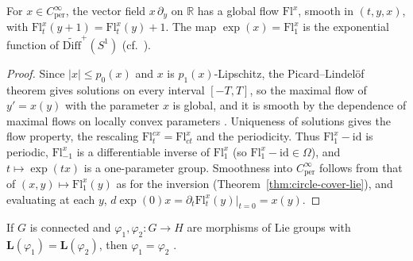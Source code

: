\begin{theorem}
  \label{thm:circle-cover-exp}
  \leanok
  For $x \in C^\infty_{\mathrm{per}}$, the vector field $x\,\partial_y$ on $\mathbb{R}$ has a
  global flow $\mathrm{Fl}^x$, smooth in $(t, y, x)$, with
  $\mathrm{Fl}^x_t(y + 1) = \mathrm{Fl}^x_t(y) + 1$. The map
  $\exp(x) = \mathrm{Fl}^x_1$ is the exponential function of
  $\widetilde{\mathrm{Diff}}^+(S^1)$ (cf.\ \cite[\S13.3]{GN26}).
\end{theorem}

\begin{proof}
  \leanok
  Since $|x| \le p_0(x)$ and $x$ is $p_1(x)$-Lipschitz, the Picard--Lindel\"of theorem gives
  solutions on every interval $[-T, T]$, so the maximal flow of $y' = x(y)$ with the parameter $x$
  is global, and it is smooth by the dependence of maximal flows on locally convex parameters
  \cite[Theorem 2.4.29]{GN26}. Uniqueness of solutions gives the flow property, the rescaling
  $\mathrm{Fl}^{cx}_t = \mathrm{Fl}^x_{ct}$ and the periodicity. Thus $\mathrm{Fl}^x_1 - \mathrm{id}$
  is periodic, $\mathrm{Fl}^x_{-1}$ is a differentiable inverse of $\mathrm{Fl}^x_1$ (so
  $\mathrm{Fl}^x_1 - \mathrm{id} \in \Omega$), and $t \mapsto \exp(tx)$ is a one-parameter group.
  Smoothness into $C^\infty_{\mathrm{per}}$ follows from that of $(x, y) \mapsto \mathrm{Fl}^x_1(y)$
  as for the inversion (Theorem~\ref{thm:circle-cover-lie}), and evaluating at each $y$,
  $d\exp(0)x = \partial_t \mathrm{Fl}^x_t(y)|_{t = 0} = x(y)$.
\end{proof}

\begin{theorem}
  \label{thm:hom-unique}
  \leanok
  If $G$ is connected and $\varphi_1, \varphi_2 \colon G \to H$ are morphisms of Lie groups with
  $\mathbf{L}(\varphi_1) = \mathbf{L}(\varphi_2)$, then $\varphi_1 = \varphi_2$
  \cite[Proposition 5.5.7]{GN26}.
\end{theorem}

